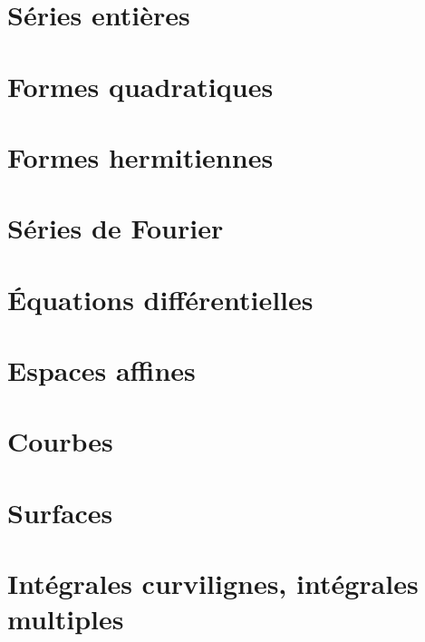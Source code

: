 \documentclass{MathBook}
\begin{document}
\chapter{Séries entières }




\chapter{Formes quadratiques }



\chapter{Formes hermitiennes }
\chapter{ Séries de Fourier }





\chapter{Équations différentielles }
\chapter{Espaces affines }
\chapter{ Courbes }
\chapter{Surfaces }
\chapter{ Intégrales curvilignes, intégrales multiples }
\end{document}
